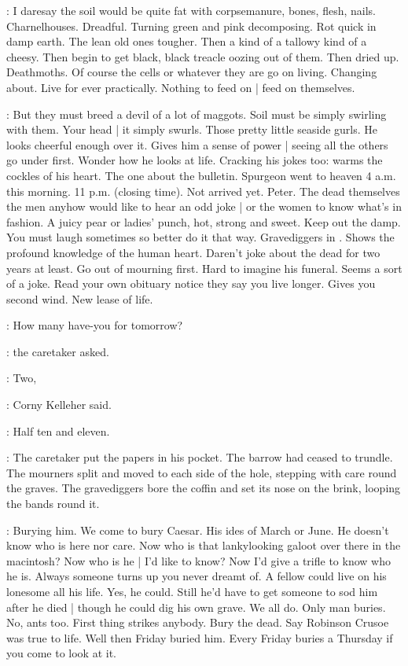 \BloomInt:
I daresay the soil would be quite fat with corpsemanure, bones, flesh, nails.
Charnelhouses.
Dreadful.
Turning green and pink decomposing.
Rot quick in damp earth.
The lean old ones tougher.
Then a kind of a tallowy kind of a cheesy.
Then begin to get black, black treacle oozing out of them.
Then dried up.
Deathmoths.
Of course the cells or whatever they are go on living.
Changing about.
Live for ever practically.
Nothing to feed on |
feed on themselves.

\BloomInt:
But they must breed a devil of a lot of maggots.
Soil must be simply swirling with them.
Your head |
it simply swurls.
Those pretty little seaside gurls.
He looks cheerful enough over it.
Gives him a sense of power |
seeing all the others go under first.
Wonder how he looks at life.
Cracking his jokes too:
warms the cockles of his heart.
The one about the bulletin.
Spurgeon went to heaven 4 a.m. this morning.
11 p.m. (closing time).
Not arrived yet.
Peter.
The dead themselves
the men anyhow would like to hear an odd joke |
or the women to know what's in fashion.
A juicy pear or ladies' punch, hot, strong and sweet.
Keep out the damp.
You must laugh sometimes so better do it that way.
Gravediggers in .
Shows the profound knowledge of the human heart.
Daren't joke about the dead for two years at least.
Go out of mourning first.
Hard to imagine his funeral.
Seems a sort of a joke.
Read your own obituary notice they say you live longer.
Gives you second wind.
New lease of life.

\oconnell:
How many have-you for tomorrow?

:
the caretaker asked.

\corny:
Two,

:
Corny Kelleher said.

\corny:
Half ten and eleven.

:
The caretaker put the papers in his pocket.
The barrow had ceased to trundle.
The mourners split and moved to each side of the hole,
stepping with care round the graves.
The gravediggers bore the coffin
and set its nose on the brink,
looping the bands round it.

\BloomInt:
Burying him.
We come to bury Caesar.
His ides of March or June.
He doesn't know who is here nor care.
Now who is that lankylooking galoot over there in the macintosh?
Now who is he |
I'd like to know?
Now I'd give a trifle to know who he is.
Always someone turns up you never dreamt of.
A fellow could live on his lonesome all his life.
Yes, he could.
Still he'd have to get someone to sod him after he died |
though he could dig his own grave.
We all do.
Only man buries.
No, ants too.
First thing strikes anybody.
Bury the dead.
Say Robinson Crusoe was true to life.
Well then Friday buried him.
Every Friday buries a Thursday if you come to look at it.

